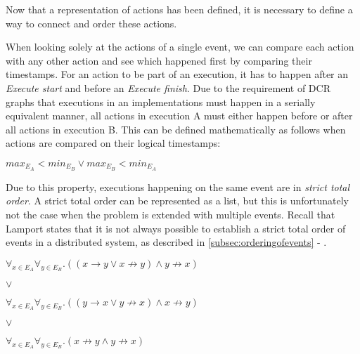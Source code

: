	\newpar Now that a representation of actions has been defined, it is necessary to define a way to connect and order these actions.
    
    \newpar When looking solely at the actions of a single event, we can compare each action with any other action and see which happened first by comparing their timestamps. For an action to be part of an execution, it has to happen after an \textit{Execute start} and before an \textit{Execute finish}. Due to the requirement of DCR graphs that executions in an implementations must happen in a serially equivalent manner, all actions in execution A must either happen before or after all actions in execution B. This can be defined mathematically as follows when actions are compared on their logical timestamps:
	

	\begin{center}
		$max_{E_A} < min_{E_B} \lor max_{E_B} < min_{E_A}$
	\end{center}
    
	\newpar Due to this property, executions happening on the same event are in  \textit{strict total order}. A strict total order can be represented as a list, but this is unfortunately not the case when the problem is extended with multiple events. Recall that Lamport states that it is not always possible to establish a strict total order of events in a distributed system, as described in \autoref{subsec:orderingofevents} - . 
	
    \begin{center}
    	\label{math:distributedExecutionOrder}
		$\forall_{x \in E_A}\forall_{y \in E_B} . ((x \rightarrow y \lor x \not\rightarrow y) \land y \not\rightarrow x)$
        
        $\lor$
        
        $\forall_{x \in E_A}\forall_{y \in E_B} . ((y \rightarrow x \lor y \not\rightarrow x) \land x \not\rightarrow y)$
        
        $\lor$
        
        $\forall_{x \in E_A}\forall_{y \in E_B} . (x \not\rightarrow y \land y \not\rightarrow x)$
	\end{center}
    

